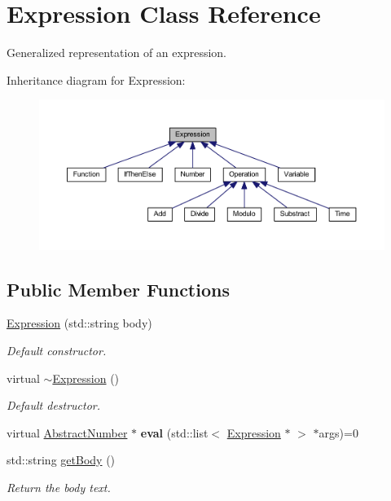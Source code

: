 \hypertarget{class_expression}{\section{Expression Class Reference}
\label{class_expression}
}


Generalized representation of an expression.  




Inheritance diagram for Expression\-:\nopagebreak
\begin{figure}[H]
\begin{center}
\leavevmode
\includegraphics[width=350pt]{class_expression__inherit__graph}
\end{center}
\end{figure}
\subsection*{Public Member Functions}
\begin{DoxyCompactItemize}
\item 
\hyperlink{class_expression_a42980da61e3dab5edd4ef12ab10d047b}{Expression} (std\-::string body)
\begin{DoxyCompactList}\small\item\em Default constructor. \end{DoxyCompactList}\item 
virtual \hyperlink{class_expression_a3e99570b177da619eeb2c5787cbb148e}{$\sim$\-Expression} ()
\begin{DoxyCompactList}\small\item\em Default destructor. \end{DoxyCompactList}\item 
\hypertarget{class_expression_a5b20a3a102b7da3f53203b867859ba7c}{virtual \hyperlink{class_abstract_number}{Abstract\-Number} $\ast$ {\bfseries eval} (std\-::list$<$ \hyperlink{class_expression}{Expression} $\ast$ $>$ $\ast$args)=0}\label{class_expression_a5b20a3a102b7da3f53203b867859ba7c}

\item 
std\-::string \hyperlink{class_expression_a5c403d29fd47e5363ff70ee813a805f4}{get\-Body} ()
\begin{DoxyCompactList}\small\item\em Return the body text. \end{DoxyCompactList}\end{DoxyCompactItemize}
